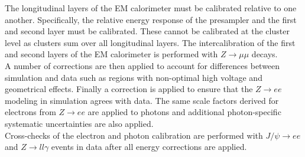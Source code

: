 \indent The longitudinal layers of the EM calorimeter must be calibrated relative to one another.  Specifically, the relative energy response of the presampler and the first and second layer must be calibrated.  These cannot be calibrated at the cluster level as clusters sum over all longitudinal layers.  The intercalibration of the first and second layers of the EM calorimeter is performed with $Z\rightarrow\mu\mu$ decays.  \\ %

\indent A number of corrections are then applied to account for differences between simulation and data such as regions with non-optimal high voltage and geometrical effects.  Finally a correction is applied to ensure that the $Z\rightarrow ee$ modeling in simulation agrees with data.  The same scale factors derived for electrons from $Z\rightarrow ee$ are applied to photons and additional photon-specific systematic uncertainties are also applied.  \\

\indent Cross-checks of the electron and photon calibration are performed with $J/\psi \rightarrow ee$ and $Z \rightarrow ll\gamma$ events in data after all energy corrections are applied.  \\